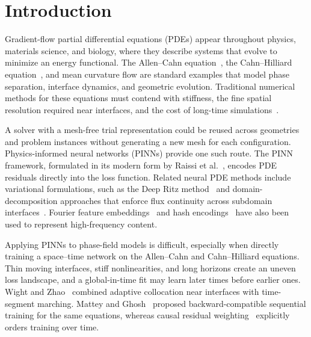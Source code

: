 \documentclass[11pt,letterpaper]{article}
\theoremstyle{plain}
\theoremstyle{definition}
\begin{document}
\noindent\hrulefill

\section{Introduction} Gradient-flow partial differential equations (PDEs) appear throughout physics, materials science, and biology, where they describe systems that evolve to minimize an energy functional. The Allen--Cahn equation~\cite{AllenCahn1979}, the Cahn--Hilliard equation~\cite{CahnHilliard1958}, and mean curvature flow are standard examples that model phase separation, interface dynamics, and geometric evolution. Traditional numerical methods for these equations must contend with stiffness, the fine spatial resolution required near interfaces, and the cost of long-time simulations~\cite{Du2020, Shen2010}.

A solver with a mesh-free trial representation could be reused across geometries and problem instances without generating a new mesh for each configuration. Physics-informed neural networks (PINNs) provide one such route. The PINN framework, formulated in its modern form by Raissi et al.~\cite{Raissi2019PINN}, encodes PDE residuals directly into the loss function. Related neural PDE methods include variational formulations, such as the Deep Ritz method~\cite{E2018Deep} and domain-decomposition approaches that enforce flux continuity across subdomain interfaces~\cite{Jagtap2020cPINN}. Fourier feature embeddings~\cite{Tancik2020Fourier} and hash encodings~\cite{Muller2022InstantNGP} have also been used to represent high-frequency content.

Applying PINNs to phase-field models is difficult, especially when directly training a space--time network on the Allen--Cahn and Cahn--Hilliard equations. Thin moving interfaces, stiff nonlinearities, and long horizons create an uneven loss landscape, and a global-in-time fit may learn later times before earlier ones. Wight and Zhao~\cite{WightZhao2021} combined adaptive collocation near interfaces with time-segment marching. Mattey and Ghosh~\cite{Mattey2022bcPINN} proposed backward-compatible sequential training for the same equations, whereas causal residual weighting~\cite{Wang2024Causality} explicitly orders training over time.
\end{document}
